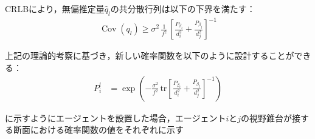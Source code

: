 CRLBにより，無偏推定量$\hat{q}_l$の共分散行列は以下の下界を満たす：
\begin{equation}
\begin{aligned}
\operatorname{Cov}(q_l) \ge \sigma^2\,\frac{1}{f^2}\,\left[\frac{P_{\beta_i}}{d_i^2} + \frac{P_{\beta_j}}{d_j^2}\right]^{-1}
\end{aligned}
\label{eq:crlb_two_cameras}
\end{equation}

上記の理論的考察に基づき，新しい確率関数を以下のように設計することができる：
\begin{equation}
\begin{aligned}
P_i^l &= \exp\left(-\frac{\sigma^2}{f^2}\,\mathrm{tr}\left[\frac{P_{\beta_i}}{d_i^2} + \frac{P_{\beta_j}}{d_j^2}\right]^{-1}\right)
\end{aligned}
\label{eq:new_probability_function}
\end{equation}

に示すようにエージェントを設置した場合，エージェント$i$と$j$の視野錐台が接する断面における確率関数の値をそれぞれに示す

